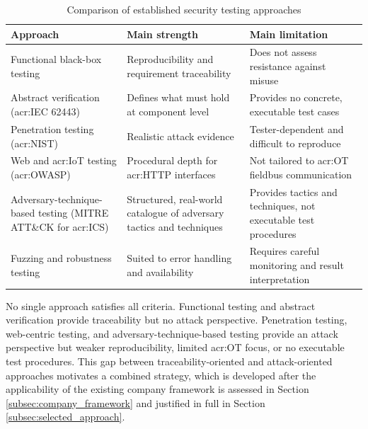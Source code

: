 \begin{table}[H] 
	\caption{Comparison of established security testing approaches} 
	\label{tab:approach_comparison} 
	\centering 
	\small
	\begin{tabular}{p{} p{} p{}} 
		\toprule 
		\textbf{Approach} & \textbf{Main strength} & \textbf{Main limitation} \\ 
		\midrule 
		Functional black-box testing \cite[p. 82]{1341418} & Reproducibility and requirement traceability & Does not assess resistance against misuse \\ \addlinespace 
		Abstract verification (\gls{acr:IEC} 62443) \cite[p. 37]{DIN_EN_IEC_62443_4_1_2018} & Defines what must hold at component level & Provides no concrete, executable test cases \\ 
		\addlinespace 
		Penetration testing (\gls{acr:NIST}) \cite[p. 296]{tauqeer2021analysis} & Realistic attack evidence & Tester-dependent and difficult to reproduce \\ 
		\addlinespace
		Web and \gls{acr:IoT} testing (\gls{acr:OWASP}) \cite{manana2026pentest} & Procedural depth for \gls{acr:HTTP} interfaces & Not tailored to \gls{acr:OT} fieldbus communication \\ 
		\addlinespace 
		Adversary-technique-based testing (MITRE ATT\&CK for \gls{acr:ICS}) \cite{mitre_attack_ics} & Structured, real-world catalogue of adversary tactics and techniques & Provides tactics and techniques, not executable test procedures \\ 
		\addlinespace 
		Fuzzing and robustness testing \cite[p. 29]{richier2011security} & Suited to error handling and availability & Requires careful monitoring and result interpretation \\ \bottomrule 
	\end{tabular} 
	
\end{table} 

No single approach satisfies all criteria. Functional testing and abstract verification provide traceability but no attack perspective. Penetration testing, web-centric testing, and adversary-technique-based testing provide an attack perspective but weaker reproducibility, limited \gls{acr:OT} focus, or no executable test procedures. This gap between traceability-oriented and attack-oriented approaches motivates a combined strategy, which is developed after the applicability of the existing company framework is assessed in Section \ref{subsec:company_framework} and justified in full in Section \ref{subsec:selected_approach}.


